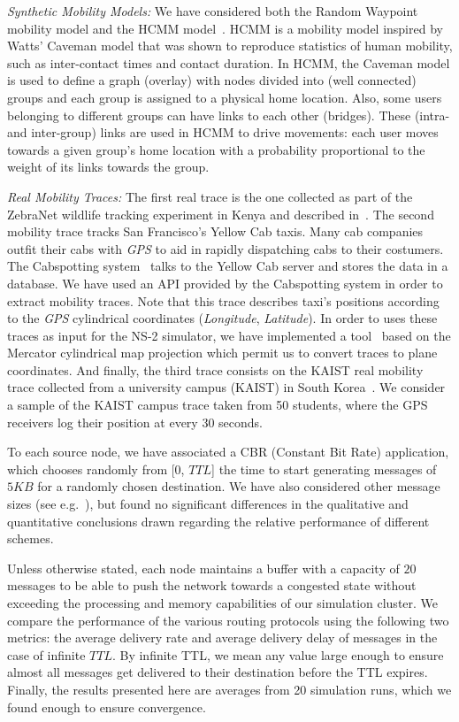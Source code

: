 \emph{Synthetic Mobility Models:} We have considered both the Random Waypoint mobility model and the HCMM model~\cite{HCMM}. HCMM is a mobility model inspired by Watts' Caveman model that was shown to reproduce statistics of human mobility, such as inter-contact times and contact duration. In HCMM, the Caveman model is used to define a graph (overlay) with nodes divided into (well connected) groups and each group is assigned to a physical home location. Also, some users belonging to different groups can have links to each other (bridges). These (intra- and inter-group) links are used in HCMM to drive movements: each user moves towards a given group's home location with a probability proportional to the weight of its links towards the group.

\emph{Real Mobility Traces:} The first real trace is the one collected as part of the ZebraNet wildlife tracking experiment in Kenya and described in~\cite{ZebraNetMovement}. The second mobility trace tracks San Francisco's Yellow Cab taxis. Many cab companies outfit their cabs with \emph{GPS} to aid in rapidly dispatching cabs to their costumers. The Cabspotting system~\cite{Cabspotting} talks to the Yellow Cab server and stores the data in a database. We have used an API provided by the Cabspotting system in order to extract mobility traces. Note that this trace describes taxi's positions according to the \emph{GPS} cylindrical coordinates (\emph{Longitude}, \emph{Latitude}). In order to uses these traces as input for the NS-2 simulator, we have implemented a tool~\cite{DTN-NS2} based on the Mercator cylindrical map projection which permit us to convert traces to plane coordinates. And finally, the third trace consists on the KAIST real mobility trace collected from a university campus (KAIST) in South Korea~\cite{KAIST}. We consider a sample of the KAIST campus trace taken from 50 students, where the GPS receivers log their position at every 30 seconds. 

To each source node, we have associated a CBR (Constant Bit Rate) application, which chooses randomly from [0, $TTL$] the time to start generating messages of $5KB$ for a randomly chosen destination. We have also considered other message sizes (see e.g.~\cite{KrifaBS08}), but found no significant differences in the qualitative and quantitative conclusions drawn regarding the relative performance of different schemes.

Unless otherwise stated, each node maintains a buffer with a capacity of $20$ messages to be able to push the network towards a congested state without exceeding the processing and memory capabilities of our simulation cluster. We compare the performance of the various routing protocols using the following two metrics: the average delivery rate and average delivery delay of messages in the case of infinite $TTL$. By infinite TTL, we mean any value large enough to ensure almost all messages get delivered to their destination before the TTL expires. Finally, the results presented here are averages from 20 simulation runs, which we found enough to ensure convergence.

